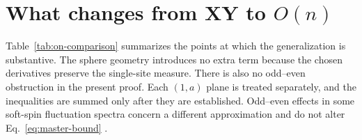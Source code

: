 \documentclass[aps,prb,twocolumn,groupedaddress,amsmath,amssymb,
               superscriptaddress,nofootinbib,floatfix]{revtex4-2}
\theoremstyle{plain}
\theoremstyle{definition}
\begin{document}
\section{What changes from XY to \texorpdfstring{$O(n)$}{O(n)}}
\label{sec:on-vs-xy}

Table~\ref{tab:on-comparison} summarizes the points at which the
generalization is substantive.  The sphere geometry introduces no extra
term because the chosen derivatives preserve the single-site measure.
There is also no odd--even obstruction in the present proof.  Each
$(1,a)$ plane is treated separately, and the inequalities are summed only
after they are established.  Odd--even effects in some soft-spin
fluctuation spectra concern a different approximation and do not alter
Eq.~\eqref{eq:master-bound} \cite{Nussinov2001}.

\begin{table}[t]
\caption{\label{tab:on-comparison}
The XY proof and its hard-spin $O(n)$ extension.  The theorem has a common
no-LRO conclusion, but it does not assert that the remaining phases have
the same correlations or topological defects.}
\centering
\renewcommand{\arraystretch}{1.18}
\end{table}
\end{document}
